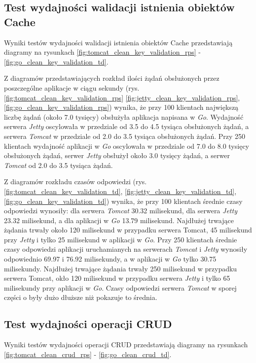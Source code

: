 % 
\clearpage

\subsection{Test wydajności walidacji istnienia obiektów Cache}
Wyniki testów wydajności walidacji istnienia obiektów Cache przedstawiają diagramy na rysunkach \ref{fig:tomcat_clean_key_validation_rps} - \ref{fig:go_clean_key_validation_td}.              

Z diagramów przedstawiających rozkład ilości żądań obsłużonych przez poszczególne aplikacje w ciągu sekundy  (rys. \ref{fig:tomcat_clean_key_validation_rps} \ref{fig:jetty_clean_key_validation_rps}, \ref{fig:go_clean_key_validation_rps}) wynika, że przy 100 klientach największą liczbę żądań (około 7.0 tysięcy) obsłużyła aplikacja napisana w \textsl{Go}. Wydajność serwera \textsl{Jetty} oscylowała w przedziale od 3.5 do 4.5 tysiąca obsłużonych żądań, a serwera \textsl{Tomcat} w przedziale od 2.0 do 3.5 tysiąca obsłużonych żądań. Przy 250 klientach wydajność aplikacji w \textsl{Go} oscylowała w przedziale od 7.0 do 8.0 tysięcy obsłużonych żądań, serwer \textsl{Jetty} obsłużył około 3.0 tysięcy żądań, a serwer \textsl{Tomcat} od 2.0 do 3.5 tysiąca żądań.

Z diagramów rozkładu czasów odpowiedzi (rys. \ref{fig:tomcat_clean_key_validation_td}, \ref{fig:jetty_clean_key_validation_td}, \ref{fig:go_clean_key_validation_td}) wynika, że przy 100 klientach średnie czasy odpowiedzi wynosiły: dla serwera \textsl{Tomcat} 30.32 milisekund, dla serwera \textsl{Jetty} 23.32 milisekund, a dla aplikacji w \textsl{Go} 13.79 milisekund. Najdłużej trwające żądania trwały około 120 milisekund w przypadku serwera Tomcat, 45 milisekund przy \textsl{Jetty} i tylko 25 milisekund w aplikacji w \textsl{Go}. Przy 250 klientach średnie czasy odpowiedzi aplikacji uruchamianych na serwerach \textsl{Tomcat} i \textsl{Jetty} wynosiły odpowiednio 69.97 i 76.92 milisekundy, a w aplikacji w \textsl{Go} tylko 30.75 milisekundy. Najdłużej trwające żądania trwały 250 milisekund w przypadku serwera Tomcat, okło 120 milisekund w przypadku serwera \textsl{Jetty} i tylko 65 milisekundy przy aplikacji w \textsl{Go}. Czasy odpowiedzi serwera \textsl{Tomcat} w sporej części o były dużo dłuższe niż pokazuje to średnia.

% 
\clearpage

\subsection{Test wydajności operacji CRUD}
Wyniki testów wydajności operacji CRUD przedstawiają diagramy na rysunkach \ref{fig:tomcat_clean_crud_rps} - \ref{fig:go_clean_crud_td}.

